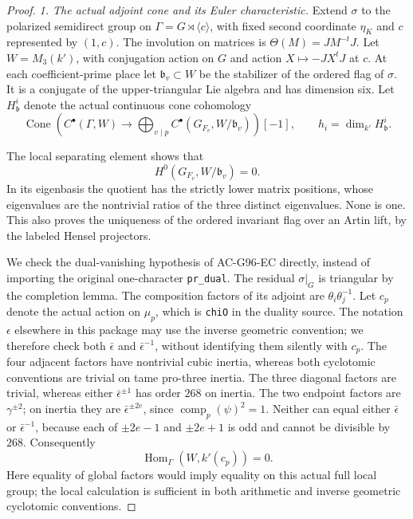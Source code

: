 \begin{proof}
\emph{1. The actual adjoint cone and its Euler characteristic.}
Extend \(\sigma\) to the polarized semidirect group on
\(\Gamma=G\rtimes\langle c\rangle\), with fixed second coordinate
\(\eta_K\) and \(c\) represented by \((1,c)\).
The involution on matrices is
\(\Theta(M)=JM^{-t}J\).
Let \(W=M_3(k')\), with conjugation action on \(G\) and
action \(X\mapsto-JX^tJ\) at \(c\).
At each coefficient-prime place let \(\mathfrak b_v\subset W\)
be the stabilizer of the ordered flag of \(\sigma\).
It is a conjugate of the upper-triangular Lie algebra and has
dimension six.  Let \(H^i_{\mathfrak b}\) denote the actual
continuous cone cohomology
\[
 \operatorname{Cone}\left(
 C^\bullet(\Gamma,W)\longrightarrow
 \bigoplus_{v\mid p}C^\bullet(G_{F_v},W/\mathfrak b_v)
                    \right)[-1],
 \qquad h_i=\dim_{k'}H^i_{\mathfrak b}.
 \tag{G101.16}
\]

The local separating element shows that
\[
                  H^0(G_{F_v},W/\mathfrak b_v)=0.
 \tag{G101.17}
\]
In its eigenbasis the quotient has the strictly lower
matrix positions, whose eigenvalues are the nontrivial ratios
of the three distinct eigenvalues.  None is one.
This also proves the uniqueness of the ordered invariant flag
over an Artin lift, by the labeled Hensel projectors.

We check the dual-vanishing hypothesis of AC-G96-EC directly,
instead of importing the original one-character \texttt{pr\_dual}.
The residual \(\sigma|_G\) is triangular by the completion lemma.
The composition factors of its adjoint are
\(\theta_i\theta_j^{-1}\).
Let \(c_p\) denote the actual action on \(\mu_p\), which is
\texttt{chiO} in the duality source.  The notation \(\epsilon\)
elsewhere in this package may use the inverse geometric convention;
we therefore check both \(\bar\epsilon\) and
\(\bar\epsilon^{-1}\), without identifying them silently with \(c_p\).
The four adjacent factors have nontrivial cubic inertia,
whereas both cyclotomic conventions are trivial on tame pro-three inertia.
The three diagonal factors are trivial, whereas either
\(\bar\epsilon^{\pm1}\) has order \(268\) on inertia.
The two endpoint factors are \(\gamma^{\pm2}\); on inertia
they are \(\bar\epsilon^{\pm2e}\), since
\(\operatorname{comp}_p(\psi)^2=1\).
Neither can equal either \(\bar\epsilon\) or \(\bar\epsilon^{-1}\),
because each of \(\pm2e-1\) and \(\pm2e+1\) is odd and cannot
be divisible by \(268\).  Consequently
\[
                 \operatorname{Hom}_\Gamma
                         (W,k'(c_p))=0.
 \tag{G101.18}
\]
Here equality of global factors would imply equality on this
actual full local group; the local calculation is sufficient in
both arithmetic and inverse geometric cyclotomic conventions.


\end{proof}
